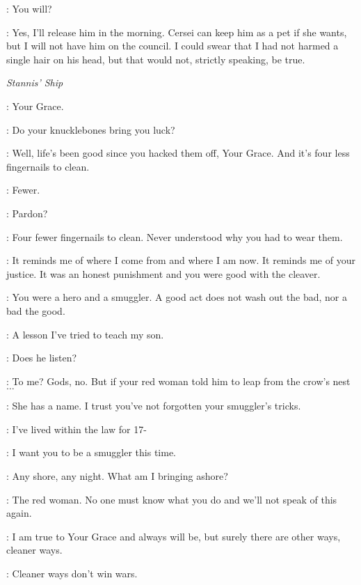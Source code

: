 \LANCEL: You will? 

\TYRION: Yes, I'll release him in the morning. Cersei can keep him as a pet if she wants, but I will not have him on the council. I could swear that I had not harmed a single hair on his head, but that would not, strictly speaking, be true. 



\scene

\textit{Stannis' Ship} 


\DAVOS: Your Grace. 

\STANNIS: Do your knucklebones bring you luck? 

\DAVOS: Well, life's been good since you hacked them off, Your Grace. And it's four less fingernails to clean. 

\STANNIS: Fewer. 

\DAVOS: Pardon? 

\STANNIS: Four fewer fingernails to clean. Never understood why you had to wear them. 

\DAVOS: It reminds me of where I come from and where I am now. It reminds me of your justice. It was an honest punishment and you were good with the cleaver. 

\STANNIS: You were a hero and a smuggler. A good act does not wash out the bad, nor a bad the good. 

\DAVOS: A lesson I've tried to teach my son. 

\STANNIS: Does he listen? 

\DAVOS: To me? Gods, no. But if your red woman told him to leap from the crow's nest $\ldots$  

\STANNIS: She has a name. I trust you've not forgotten your smuggler's tricks. 

\DAVOS: I've lived within the law for 17- 

\STANNIS:   I want you to be a smuggler this time. 

\DAVOS: Any shore, any night. What am I bringing ashore? 

\STANNIS: The red woman. No one must know what you do and we'll not speak of this again. 

\DAVOS: I am true to Your Grace and always will be, but surely there are other ways, cleaner ways. 

\STANNIS: Cleaner ways don't win wars. 




